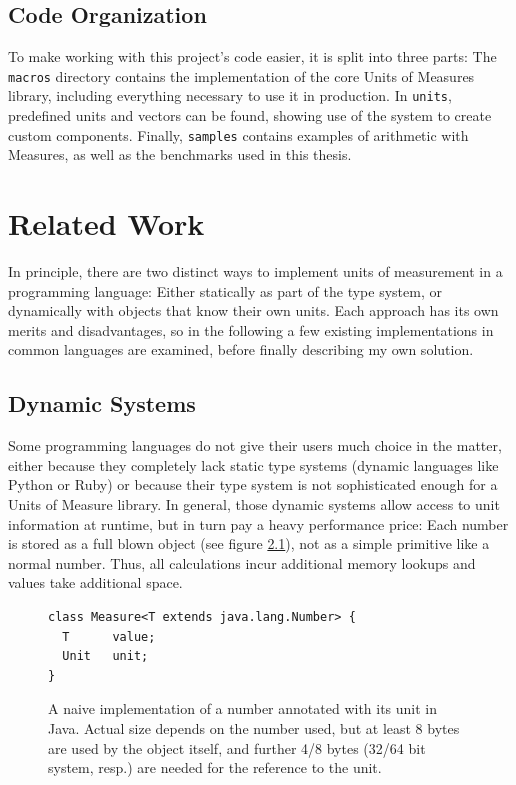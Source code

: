 \documentclass[12pt,oneside,a4paper]{scrbook}
\begin{document}
\section{Code Organization}
To make working with this project's code easier, it is split into three parts: The \verb|macros| directory contains the implementation of the core Units of Measures library, including everything necessary to use it in production. In \verb|units|, predefined units and vectors can be found, showing use of the system to create custom components. Finally, \verb|samples| contains examples of arithmetic with Measures, as well as the benchmarks used in this thesis.




\chapter{Related Work}
In principle, there are two distinct ways to implement units of measurement in a programming language: Either statically as part of the type system, or dynamically with objects that know their own units. Each approach has its own merits and disadvantages, so in the following a few existing implementations in common languages are examined, before finally describing my own solution.


\section{Dynamic Systems}
Some programming languages do not give their users much choice in the matter, either because they completely lack static type systems (dynamic languages like Python or Ruby) or because their type system is not sophisticated enough for a Units of Measure library.
In general, those dynamic systems allow access to unit information at runtime, but in turn pay a heavy performance price: Each number is stored as a full blown object (see figure \ref{code:naive_java_measure}), not as a simple primitive like a normal number. Thus, all calculations incur additional memory lookups and values take additional space.

\begin{figure}
\begin{verbatim}
class Measure<T extends java.lang.Number> {
  T      value;
  Unit   unit;
}
\end{verbatim}
\caption{A naive implementation of a number annotated with its unit in Java. Actual size depends on the number used, but at least 8 bytes are used by the object itself, and further 4/8 bytes (32/64 bit system, resp.) are needed for the reference to the unit.}
\label{code:naive_java_measure}
\end{figure}
\end{document}
